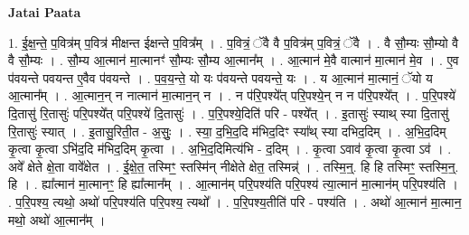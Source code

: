 \documentclass[17pt]{extarticle}
\begin{document}
\textbf{Jatai Paata} \newline

1. ई॒क्ष॒न्ते॒ प॒वित्र॑म् प॒वित्र॑ मीक्षन्त ईक्षन्ते प॒वित्र᳚म् । . प॒वित्रं॒ ॅवै वै प॒वित्र॑म् प॒वित्रं॒ ॅवै । . वै सौ॒म्यः सौ॒म्यो वै वै सौ॒म्यः । . सौ॒म्य आ॒त्मान॑ मा॒त्मानꣳ॑ सौ॒म्यः सौ॒म्य आ॒त्मान᳚म् । . आ॒त्मान॑ मे॒वै वात्मान॑ मा॒त्मान॑ मे॒व । . ए॒व प॑वयन्ते पवयन्त ए॒वैव प॑वयन्ते । . प॒व॒य॒न्ते॒ यो यः प॑वयन्ते पवयन्ते॒ यः । . य आ॒त्मान॑ मा॒त्मानं॒ ॅयो य आ॒त्मान᳚म् । . आ॒त्मान॒न् न नात्मान॑ मा॒त्मान॒न् न । . न प॑रि॒पश्ये᳚त् परि॒पश्ये॒न् न न प॑रि॒पश्ये᳚त् । . प॒रि॒पश्ये॑ दि॒तासु॑ रि॒तासुः॑ परि॒पश्ये᳚त् परि॒पश्ये॑ दि॒तासुः॑ । . प॒रि॒पश्ये॒दिति॑ परि - पश्ये᳚त् । . इ॒तासुः॑ स्याथ् स्या दि॒तासु॑ रि॒तासुः॑ स्यात् । . इ॒तासु॒रिती॒त - अ॒सुः॒ । . स्या॒ द॒भि॒द॒दि म॑भिद॒दिꣳ स्या᳚थ् स्या दभिद॒दिम् । . अ॒भि॒द॒दिम् कृ॒त्वा कृ॒त्वा ऽभि॑द॒दि म॑भिद॒दिम् कृ॒त्वा । . अ॒भि॒द॒दिमित्य॑भि - द॒दिम् । . कृ॒त्वा ऽवाव॑ कृ॒त्वा कृ॒त्वा ऽव॑ । . अवे᳚ क्षेते क्षे॒ता वावे᳚क्षेत । . ई॒क्षे॒त॒ तस्मिꣳ॒॒ स्तस्मि॑न् नीक्षेते क्षेत॒ तस्मिन्न्॑ । . तस्मि॒न्॒. हि हि तस्मिꣳ॒॒ स्तस्मि॒न्॒. हि । . ह्या᳚त्मान॑ मा॒त्मानꣳ॒॒ हि ह्या᳚त्मान᳚म् । . आ॒त्मान॑म् परि॒पश्य॑ति परि॒पश्य॑ त्या॒त्मान॑ मा॒त्मान॑म् परि॒पश्य॑ति । . प॒रि॒पश्य॒ त्यथो॒ अथो॑ परि॒पश्य॑ति परि॒पश्य॒ त्यथो᳚ । . प॒रि॒पश्य॒तीति॑ परि - पश्य॑ति । . अथो॑ आ॒त्मान॑ मा॒त्मान॒ मथो॒ अथो॑ आ॒त्मान᳚म् । \newline
\end{document}
